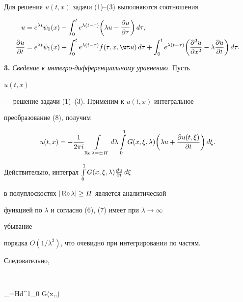 


Для решения $u(t,x)$ задачи (1)--(3) выполняются соотношения 


\begin{equation} 


\begin{split} 


u&=e^{\lambda t}\psi_0(x)-\int^t_0 e^{\lambda(t-\tau)} 


\biggl(\lambda u-\myfrac{u}{\tau} \biggr)\,d\tau,\\ 


\myfrac{u}{t}&=e^{\lambda t}\psi_1(x)+ 


\int^t_0 e^{\lambda(t-\tau)}f(\tau,x,\wt u)\,d\tau+ 


\int^t_0 e^{\lambda(t-\tau)}\biggl(\myfrac{^2u}{x^2}-\lambda 


\myfrac{u}{t}\biggr)\,d\tau. 


\end{split} 


\end{equation} 


 


{\bf 3.} {\it Сведение к интегро-дифференциальному уравнению.} Пусть 


$u(t,x)$ 


--- решение задачи (1)--(3). Применим к $u(t,x)$ интегральное 


преобразование (8), получим 


$$ 


u(t,x)=-\frac{1}{2\pi i}\intl_{\re\lambda=\pm H}d\lambda 


\intl^1_0 G(x,\xi,\lambda)\biggl(\lambda u+ 


\myfrac{u(t,\xi)}{t}\biggr)\,d\xi. 


$$ 


Действительно, интеграл $\int\limits^1_0G(x,\xi,\lambda)\frac{\partial u}{\partial t}\,d\xi$ 


в полуплоскостях $|\operatorname{Re}\lambda|\ge H$ является аналитической 


функцией по $\lambda$ и согласно (6), (7) имеет при $\lambda\to\infty$ 


убывание 


порядка $O(1/\lambda^2)$, что очевидно при интегрировании по частям. 


Следовательно, 


$$ 


\intl_{\re\lambda=\pm H}d\lambda\intl^1_0 G(x,\xi,\lambda) 


